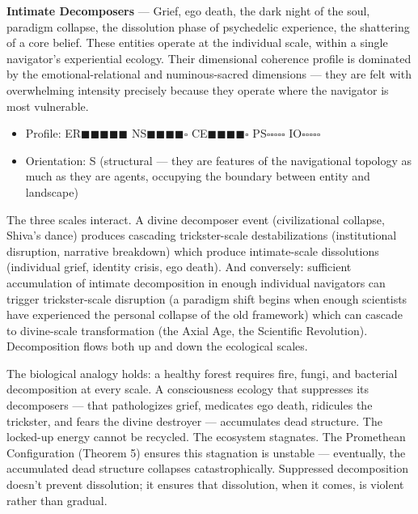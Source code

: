 \textbf{Intimate Decomposers} — Grief, ego death, the dark night of the soul, paradigm collapse, the dissolution phase of psychedelic experience, the shattering of a core belief. These entities operate at the individual scale, within a single navigator's experiential ecology. Their dimensional coherence profile is dominated by the emotional-relational and numinous-sacred dimensions — they are felt with overwhelming intensity precisely because they operate where the navigator is most vulnerable.

\begin{itemize}[nosep,leftmargin=*]
  \item Profile: ER$\blacksquare$$\blacksquare$$\blacksquare$$\blacksquare$$\blacksquare$ NS$\blacksquare$$\blacksquare$$\blacksquare$$\blacksquare$$\square$ CE$\blacksquare$$\blacksquare$$\blacksquare$$\blacksquare$$\square$ PS$\square$$\square$$\square$$\square$$\square$ IO$\square$$\square$$\square$$\square$$\square$
  \item Orientation: S (structural — they are features of the navigational topology as much as they are agents, occupying the boundary between entity and landscape)
\end{itemize}


The three scales interact. A divine decomposer event (civilizational collapse, Shiva's dance) produces cascading trickster-scale destabilizations (institutional disruption, narrative breakdown) which produce intimate-scale dissolutions (individual grief, identity crisis, ego death). And conversely: sufficient accumulation of intimate decomposition in enough individual navigators can trigger trickster-scale disruption (a paradigm shift begins when enough scientists have experienced the personal collapse of the old framework) which can cascade to divine-scale transformation (the Axial Age, the Scientific Revolution). Decomposition flows both up and down the ecological scales.


The biological analogy holds: a healthy forest requires fire, fungi, and bacterial decomposition at every scale. A consciousness ecology that suppresses its decomposers — that pathologizes grief, medicates ego death, ridicules the trickster, and fears the divine destroyer — accumulates dead structure. The locked-up energy cannot be recycled. The ecosystem stagnates. The Promethean Configuration (Theorem 5) ensures this stagnation is unstable — eventually, the accumulated dead structure collapses catastrophically. Suppressed decomposition doesn't prevent dissolution; it ensures that dissolution, when it comes, is violent rather than gradual.



